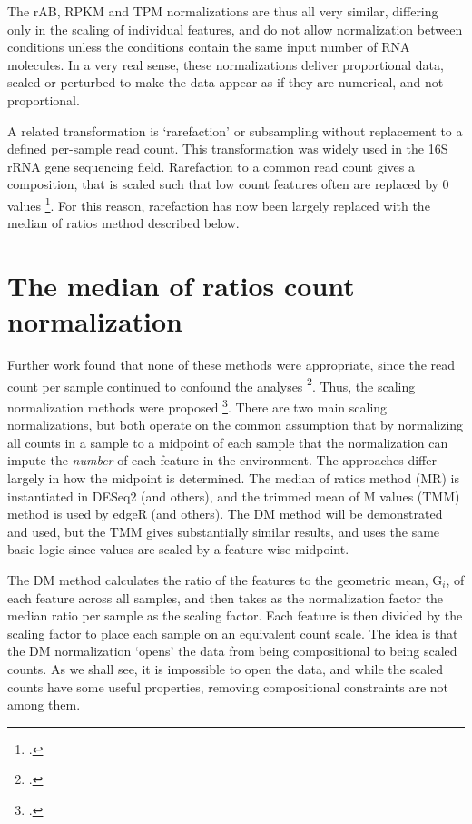 
The rAB, RPKM and TPM normalizations are thus all very similar, differing only in the scaling of individual features, and do not allow normalization between conditions unless the conditions contain the same input number of RNA molecules. In a very real sense, these normalizations deliver proportional data, scaled or perturbed to make the data appear as if they are numerical, and not proportional.

A related transformation is `rarefaction' or subsampling without replacement to a defined per-sample read count. This transformation was widely used in the 16S rRNA gene sequencing field. Rarefaction to a common read count gives a composition, that is scaled such that low count features often are replaced by 0 values \footcite{McMurdie:2014a}. For this reason, rarefaction has now been largely replaced with the median of ratios method described below. 

\section{The median of ratios count normalization} 

Further work found that none of these methods were appropriate, since the read count per sample continued to confound the analyses \footcite{Loven:2012aa}. Thus, the scaling normalization methods were proposed \footcite{Robinson:2010a}. There are two main scaling normalizations, but both operate on the common assumption that by normalizing all counts in a sample to a midpoint of each sample that the normalization can impute the {\em number} of each feature in the environment.  The approaches differ largely in how the midpoint is determined. The median of ratios method (MR) is instantiated in DESeq2 (and others), and the trimmed mean of M values (TMM) method is used by edgeR (and others). The DM method will be demonstrated and used, but the TMM gives substantially similar results, and uses the same basic logic since values are scaled by a feature-wise midpoint.

The DM method calculates the ratio of the features to the geometric mean, $\mathrm{G}_i$, of each feature across all samples, and then takes as the normalization factor the median ratio per sample as the scaling factor. Each feature is then divided by the scaling factor to place each sample on an equivalent count scale. The idea is that the DM normalization `opens' the data from being compositional to being scaled counts. As we shall see, it is impossible to open the data, and while the scaled counts have some useful properties, removing  compositional constraints are not among them. 

